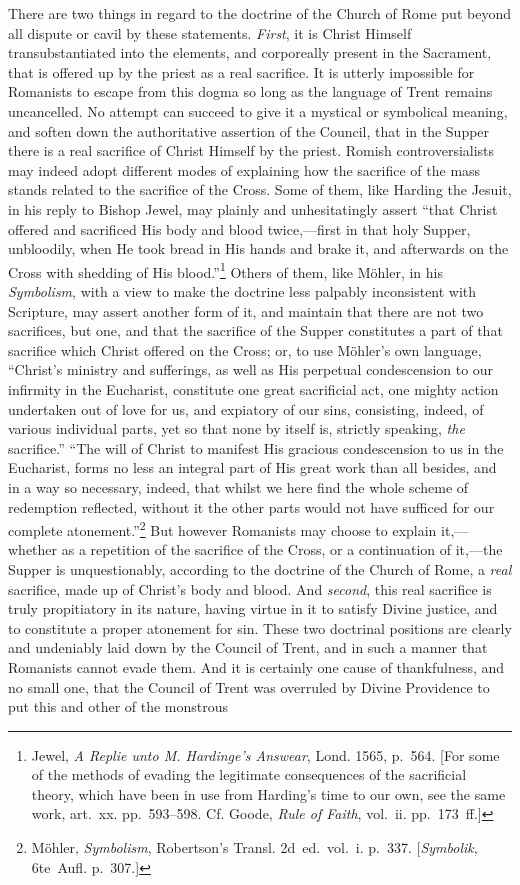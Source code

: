\documentclass[
  english,
]{book}
\newcommand{\textgerman}[2][]{\foreignlanguage{ngerman}{#2}}
\begin{document}
There are two things in regard to the doctrine of the Church of Rome put beyond all dispute or cavil by these statements. \emph{First}, it is Christ Himself transubstantiated into the elements, and corporeally present in the Sacrament, that is offered up by the priest as a real sacrifice. It is utterly impossible for Romanists to escape from this dogma so long as the language of Trent remains uncancelled. No attempt can succeed to give it a mystical or symbolical meaning, and soften down the authoritative assertion of the Council, that in the Supper there is a real sacrifice of Christ Himself by the priest. Romish controversialists may indeed adopt different modes of explaining how the sacrifice of the mass stands related to the sacrifice of the Cross. Some of them, like Harding the Jesuit, in his reply to Bishop Jewel, may plainly and unhesitatingly assert ``that Christ offered and sacrificed His body and blood twice,---first in that holy Supper, unbloodily, when He took bread in His hands and brake it, and afterwards on the Cross with shedding of His blood.''\footnote{Jewel, \emph{A Replie unto M. Hardinge's Answear}, Lond. 1565, p.~564. {[}For some of the methods of evading the legitimate consequences of the sacrificial theory, which have been in use from Harding's time to our own, see the same work, art.~xx. pp.~593--598. Cf. Goode, \emph{Rule of Faith}, vol.~ii. pp.~173~ff.{]}} Others of them, like Möhler, in his \emph{Symbolism}, with a view to make the doctrine less palpably inconsistent with Scripture, may assert another form of it, and maintain that there are not two sacrifices, but one, and that the sacrifice of the Supper constitutes a part of that sacrifice which Christ offered on the Cross; or, to use Möhler's own language, ``Christ's ministry and sufferings, as well as His perpetual condescension to our infirmity in the Eucharist, constitute one great sacrificial act, one mighty action undertaken out of love for us, and expiatory of our sins, consisting, indeed, of various individual parts, yet so that none by itself is, strictly speaking, \emph{the} sacrifice.'' ``The will of Christ to manifest His gracious condescension to us in the Eucharist, forms no less an integral part of His great work than all besides, and in a way so necessary, indeed, that whilst we here find the whole scheme of redemption reflected, without it the other parts would not have sufficed for our complete atonement.''\footnote{Möhler, \emph{Symbolism}, Robertson's Transl. 2d~ed.~vol.~i. p.~337. {[}\textgerman{\emph{Symbolik}}, 6te~Aufl. p.~307.{]}} But however Romanists may choose to explain it,---whether as a repetition of the sacrifice of the Cross, or a continuation of it,---the Supper is unquestionably, according to the doctrine of the Church of Rome, a \emph{real} sacrifice, made up of Christ's body and blood. And \emph{second}, this real sacrifice is truly propitiatory in its nature, having virtue in it to satisfy Divine justice, and to constitute a proper atonement for sin. These two doctrinal positions are clearly and undeniably laid down by the Council of Trent, and in such a manner that Romanists cannot evade them. And it is certainly one cause of thankfulness, and no small one, that the Council of Trent was overruled by Divine Providence to put this and other of the monstrous 
\end{document}
